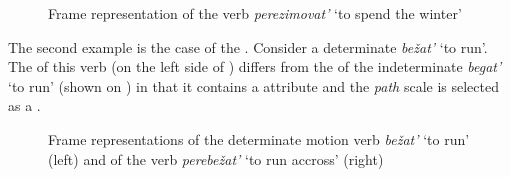 \begin{figure}
\centering
{}
\caption{Frame representation of the verb \textit{perezimovat'} `to spend the winter' \label{frame:perezimovat}}
\end{figure}

The second example is the case of the . Consider a determinate  \textit{be\v{z}at'} `to run'. The  of this verb (on the left side of ) differs from the  of the indeterminate  \textit{begat'} `to run' (shown on ) in that it contains a \PATH attribute and the \textit{path} scale is selected as a . 

\begin{figure}\small
{}
\hfill
{}
\caption{Frame representations of the determinate motion verb \textit{be\v{z}at'} `to run' (left) and of the verb \textit{perebe\v{z}at'} `to run accross' (right) \label{frame:bezhat}}
\end{figure}

